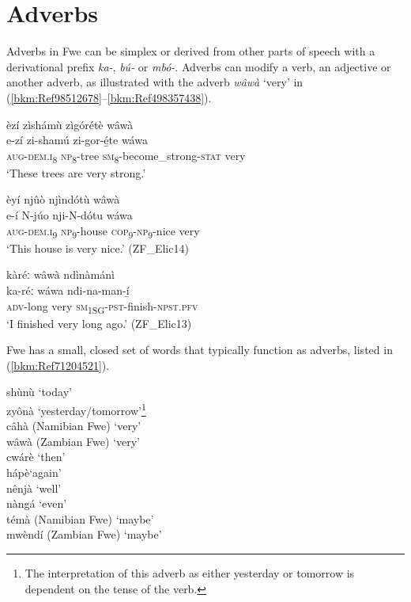 \section{Adverbs}
\label{bkm:Ref489870394}\hypertarget{Toc75352656}{}
Adverbs in Fwe can be simplex or derived from other parts of speech with a derivational prefix \textit{ka-}, \textit{bú-} or \textit{mbó-}. Adverbs can modify a verb, an adjective or another adverb, as illustrated with the adverb \textit{wâwà} ‘very’ in (\ref{bkm:Ref98512678}--\ref{bkm:Ref498357438}).

\ea
\label{bkm:Ref98512678}
èzí zìshámù zìgórétè wâwà\\
\gll e-zí    zi-shamú  zi-gor-é̲te      wáwa\\
\textsc{aug}-\textsc{dem}.\textsc{i}\textsubscript{8}  \textsc{np}\textsubscript{8}-tree  \textsc{sm}\textsubscript{8}-become\_strong-\textsc{stat}  very\\
\glt ‘These trees are very strong.’
\z

\ea
èyí njûò njìndótù wâwà\\
\gll e-í    N-júo    nji-N-dótu    wáwa\\
\textsc{aug}-\textsc{dem}.\textsc{i}\textsubscript{9}  \textsc{np}\textsubscript{9}-house  \textsc{cop}\textsubscript{9}-\textsc{np}\textsubscript{9}-nice  very\\
\glt ‘This house is very nice.’ (ZF\_Elic14)
\z

\ea
\label{bkm:Ref498357438}
kàréː wâwà ndìnàmánì\\
\gll ka-réː    wáwa  ndi-na-man-í̲\\
\textsc{adv}-long  very  \textsc{sm}\textsubscript{1SG}-\textsc{pst}-finish-\textsc{npst}.\textsc{pfv}\\
\glt ‘I finished very long ago.’ (ZF\_Elic13)
\z

Fwe has a small, closed set of words that typically function as adverbs, listed in (\ref{bkm:Ref71204521}).

\ea
\label{bkm:Ref71204521}
shùnù   \tab     ‘today’\\
zyônà        \tab ‘yesterday/tomorrow’\footnote{The interpretation of this adverb as either yesterday or tomorrow is dependent on the tense of the verb.}\\
câhà (Namibian Fwe)  \tab  ‘very’\\
wâwà (Zambian Fwe)  \tab‘very’ \\
cwárè    \tab    ‘then’\\
hápè\tab        ‘again’\\
nênjà   \tab     ‘well’\\
nàngá       \tab ‘even’\\
témà (Namibian Fwe) \tab  ‘maybe’\\
mwèndí (Zambian Fwe) \tab‘maybe’
\z

